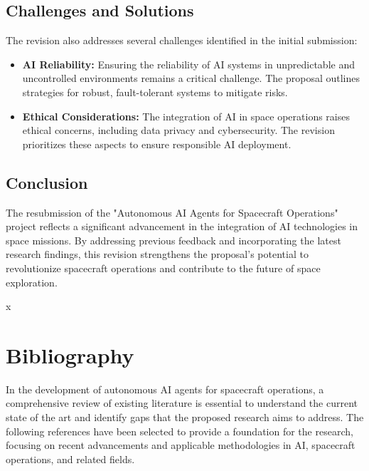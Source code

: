 \documentclass[a4paper,12pt]{article}
\begin{document}
\subsection{Challenges and Solutions}

The revision also addresses several challenges identified in the initial submission:

\begin{itemize}
    \item \textbf{AI Reliability:} Ensuring the reliability of AI systems in unpredictable and uncontrolled environments remains a critical challenge. The proposal outlines strategies for robust, fault-tolerant systems to mitigate risks.
    \item \textbf{Ethical Considerations:} The integration of AI in space operations raises ethical concerns, including data privacy and cybersecurity. The revision prioritizes these aspects to ensure responsible AI deployment.
\end{itemize}

\subsection{Conclusion}

The resubmission of the "Autonomous AI Agents for Spacecraft Operations" project reflects a significant advancement in the integration of AI technologies in space missions. By addressing previous feedback and incorporating the latest research findings, this revision strengthens the proposal's potential to revolutionize spacecraft operations and contribute to the future of space exploration.



x
\section{Bibliography}

In the development of autonomous AI agents for spacecraft operations, a comprehensive review of existing literature is essential to understand the current state of the art and identify gaps that the proposed research aims to address. The following references have been selected to provide a foundation for the research, focusing on recent advancements and applicable methodologies in AI, spacecraft operations, and related fields.
\end{document}
